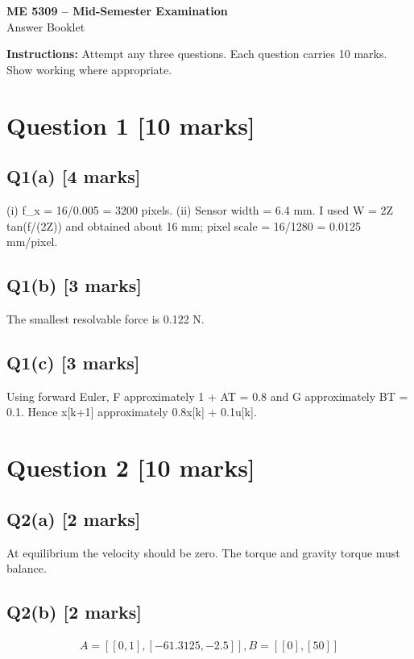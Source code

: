 \documentclass[11pt,a4paper]{article}
\begin{document}
\begin{center}
{\Large\bfseries ME 5309 -- Mid-Semester Examination}\\[3pt]
{\large Answer Booklet}\\[8pt]
\end{center}
\textbf{Instructions:} Attempt any three questions. Each question carries 10 marks. Show working where appropriate.
\section*{Question 1 \hfill [10 marks]}
\subsection*{Q1(a) \hfill [4 marks]}

(i) f\_x = 16/0.005 = 3200 pixels.
(ii) Sensor width = 6.4 mm.
I used W = 2Z tan(f/(2Z)) and obtained about 16 mm; pixel scale = 16/1280 = 0.0125 mm/pixel.

\subsection*{Q1(b) \hfill [3 marks]}

The smallest resolvable force is 0.122 N.

\subsection*{Q1(c) \hfill [3 marks]}

Using forward Euler, F approximately 1 + AT = 0.8 and G approximately BT = 0.1.
Hence x[k+1] approximately 0.8x[k] + 0.1u[k].

\section*{Question 2 \hfill [10 marks]}
\subsection*{Q2(a) \hfill [2 marks]}

At equilibrium the velocity should be zero.
The torque and gravity torque must balance.

\subsection*{Q2(b) \hfill [2 marks]}

\[\begin{aligned}A = [[0,1], [-61.3125,-2.5]], B = [[0],[50]]\end{aligned}\]
\end{document}

